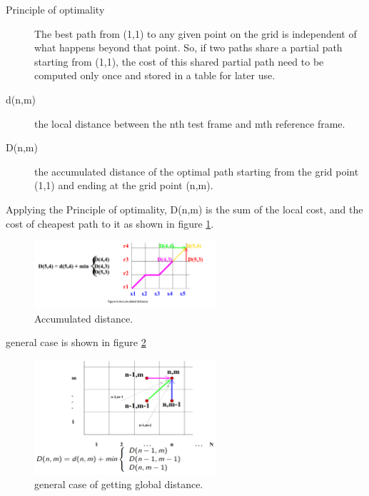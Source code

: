 \documentclass[12pt, a4paper, twoside]{report}
\begin{document}
\begin{description}
\item [Principle of optimality] The best path from (1,1) to any given point on the grid is independent of what happens beyond that point. So, if two paths share a partial path starting from (1,1), the cost of this shared partial path need to be computed only once and
stored in a table for later use.
\item [d(n,m)] the local distance between the nth test frame and mth reference frame.
\item [D(n,m)] the accumulated distance of the optimal path starting from the grid point (1,1) and ending at the grid point (n,m). 
\end{description}
Applying the Principle of optimality, D(n,m) is the sum of the local cost, and the cost of cheapest path to it as shown in figure \ref{fig:dtw-acc-dist}.
\begin{figure}[H]
	\centering
	\includegraphics[width=0.6\textwidth]
	{images/chapter4/dtw-acc-dist}
	\caption{Accumulated distance.}
	\label{fig:dtw-acc-dist}
\end{figure}

general case is shown in figure \ref{fig:dtw-general-case}
\begin{figure}[H]
	\centering
	\includegraphics[width=0.6\textwidth]
	{images/chapter4/dtw-general-case}
	\caption{general case of getting global distance.}
	\label{fig:dtw-general-case}
\end{figure}
\end{document}
